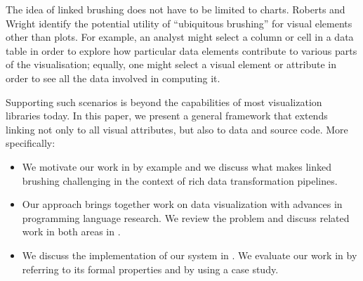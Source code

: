 The idea of linked brushing does not have to be limited to charts. Roberts and
Wright \cite{roberts06} identify the potential utility of ``ubiquitous brushing'' for visual
elements other than plots. For example, an analyst might select a column or cell in a data
table in order to explore how particular data elements contribute to various
parts of the visualisation; equally, one might select a visual element or
attribute in order to see all the data involved in computing it.

Supporting such scenarios is beyond the capabilities of most visualization libraries today.
In this paper, we present a general framework that extends linking not only to all visual
attributes, but also to data and source code. More specifically:

\begin{itemize}
\item We motivate our work in  by example and we discuss what makes linked
  brushing challenging in the context of rich data transformation pipelines.

\item Our approach brings together work on data visualization with advances in programming
  language research. We review the problem and discuss related work in both areas
  in .

\item We discuss the implementation of our system in . We evaluate our
  work in  by referring to its formal properties and by using a case study.
\end{itemize}
